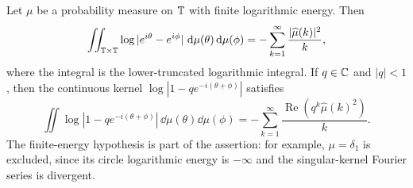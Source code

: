 \begin{lemma}\label{lem:circle-log-kernel-fourier-truncation}
Let \(\mu\) be a probability measure on \(\mathbb{T}\) with finite logarithmic energy.  Then
\[
\iint_{\mathbb{T}\times\mathbb{T}}\log|e^{i\theta}-e^{i\phi}|\,\,\mathrm{d}\mu(\theta)\,\mathrm{d}\mu(\phi)
=-
\sum_{k=1}^{\infty}\frac{|\widehat\mu(k)|^2}{k},
\]
where the integral is the lower-truncated logarithmic integral.  If
\(q\in\mathbb{C}\) and \(|q|<1\), then the continuous kernel
\(\log|1-qe^{-i(\theta+\phi)}|\) satisfies
\[
\iint\log|1-qe^{-i(\theta+\phi)}|\,\dd\mu(\theta)\dd\mu(\phi)
=-
\sum_{k=1}^{\infty}\frac{\operatorname{Re}(q^k\widehat\mu(k)^2)}{k}.
\]
The finite-energy hypothesis is part of the assertion: for example,
\(\mu=\delta_1\) is excluded, since its circle logarithmic energy is
\(-\infty\) and the singular-kernel Fourier series is divergent.
\end{lemma}

